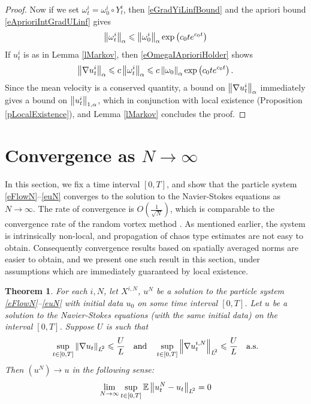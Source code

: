 \documentclass[final]{amsart}%
\newcommand{\mceuler}{\eqref{eFlowN}--\eqref{euN}\xspace}
\newcommand{\grad}{\nabla}
\renewcommand{\leq}{\leqslant}
\newcommand{\E}{\mathbb{E}}
\newcommand{\as}{\text{a.s.}}
\newif\iftextstyle
\newcommand{\norm}[1]{\iftextstyle\lVert#1\rVert\else\left\lVert#1\right\rVert\fi}
\newcommand{\holdernorm}[3]{\norm{#1}_{\ifx0#2{#3}\else{#2,#3}\fi}}
\newcommand{\lpnorm}[2]{\norm{#1}_{\smash{L^{\!#2}_{\vphantom{h}}}\vphantom{L^{\!#2}}}}
\numberwithin{equation}{section}
\newtheorem{theorem}{Theorem}[section]
\theoremstyle{definition}
\theoremstyle{remark}
\begin{document}
\begin{proof}
Now if we set $\omega^i_t = \omega_0^i \circ Y^i_t$, then
\eqref{eGradYiLinfBound} and the apriori bound
\eqref{eAprioriIntGradULinf} gives
\begin{equation}\label{eOmegaIAprioriHolder}
\holdernorm{\omega^i_t}{0}{\alpha} \leq \holdernorm{\omega^i_0}{0}{\alpha} \exp\left( c_0 t e^{c_0 t} \right)
\end{equation}
If $u^i_t$ is as in Lemma \ref{lMarkov}, then \eqref{eOmegaIAprioriHolder} shows
\begin{equation}\label{eGradUBound}
  \holdernorm{\grad u^i_t}{0}{\alpha} \leq c
  \holdernorm{\omega^i_t}{0}{\alpha} \leq
  c\holdernorm{\omega_0}{0}{\alpha} \exp\left( c_0 t e^{c_0 t}
  \right). 
\end{equation}
Since the mean velocity is a conserved quantity, a bound on
$\holdernorm{\grad u^i_t}{0}{\alpha}$ immediately gives a bound on
$\holdernorm{u^i_t}{1}{\alpha}$, which in conjunction with local
existence (Proposition \ref{pLocalExistence}), and Lemma \ref{lMarkov}
concludes the proof.
\end{proof}%

\section{Convergence as \texorpdfstring{$N\to\infty$}{N to infinity}}\label{sNtoInfty}%
In this section, we fix a time interval $[0,T]$, and show that the
particle system \mceuler converges to the solution to the
Navier-Stokes equations as $N \to \infty$. The rate of convergence is
$O(\frac{1}{\sqrt{N}})$, which is comparable to the convergence rate of the random vortex method \cites{bibLong,bibChorin}. As mentioned earlier, the system is intrinsically non-local, and propagation of chaos \cite{bibSznitman} type estimates are not easy to obtain. Consequently convergence results based on spatially averaged norms are easier to obtain, and we present one such result in this section, under assumptions which are immediately guaranteed by local existence.

\begin{theorem}\label{tConvergence}%
  For each $i, N$, let $X^{i,N}$, $u^N$ be a solution to the particle
  system \mceuler with initial data $u_0$ on some time interval
  $[0,T]$. Let $u$ be a solution to the Navier-Stokes equations (with
  the same initial data) on the interval $[0,T]$. Suppose $U$ is such
  that
$$
\sup_{t \in [0,T]} \lpnorm{\grad u_t}{2} \leq \frac{U}{L}
\quad\text{and}\quad \sup_{t \in [0,T]} \lpnorm{ \grad u^{i,N}_t }{2}
\leq \frac{U}{L} \quad\as
$$
Then $(u^N) \to u$ in the following sense:
$$
\lim_{N \to \infty} \sup_{t \in [0,T]} \E \lpnorm{u^N_t - u_t}{2} = 0
$$
\end{theorem}%
\end{document}
